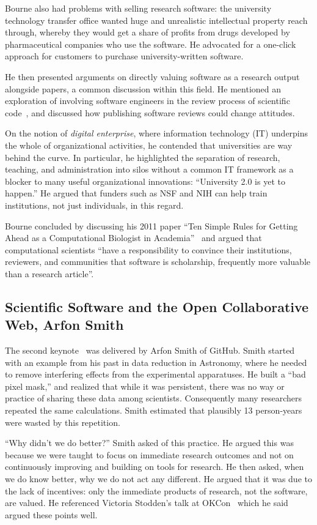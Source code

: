 \documentclass[11pt, oneside]{amsart}
\begin{document}
Bourne also had problems with selling research software: the
university technology transfer office wanted huge and unrealistic
intellectual property reach through, whereby they would get a share of
profits from drugs developed by pharmaceutical companies who use the
software.  He advocated for a one-click approach for customers to
purchase university-written software.

He then presented arguments on directly valuing software as a research
output alongside papers, a common discussion within this field.  He
mentioned an exploration of involving software engineers in the review
process of scientific code~\cite{peer-review-code}, and discussed how
publishing software reviews could change attitudes.

On the notion of \emph{digital enterprise}, where information
technology (IT) underpins the whole of organizational activities, he
contended that universities are way behind the curve. In particular,
he highlighted the separation of research, teaching, and
administration into silos without a common IT framework as a blocker
to many useful organizational innovations: ``University 2.0 is yet to
happen.''  He argued that funders such as NSF and NIH can help train
institutions, not just individuals, in this regard.

Bourne concluded by discussing his 2011 paper ``Ten Simple Rules for
Getting Ahead as a Computational Biologist in
Academia''~\cite{bourne_ten} and argued that computational scientists
``have a responsibility to convince their institutions, reviewers, and
communities that software is scholarship, frequently more valuable
than a research article''.

\subsection{Scientific Software and the Open Collaborative Web, Arfon Smith} \label{sec:keynote2}

The second keynote~\cite{WSSSPE1-keynote2} was delivered by Arfon
Smith of GitHub. Smith started with an example from his past in data
reduction in Astronomy, where he needed to remove interfering effects
from the experimental apparatuses. He built a ``bad pixel mask,'' and
realized that while it was persistent, there was no way or practice of
sharing these data among scientists. Consequently many researchers
repeated the same calculations. Smith estimated that plausibly 13 person-years
were wasted by this repetition.

``Why didn't we do better?''  Smith asked of this practice. He argued
this was because we were taught to focus on immediate research
outcomes and not on continuously improving and building on tools for
research. He then asked, when we do know better, why we do not act any
different. He argued that it was due to the lack of incentives: only
the immediate products of research, not the software, are valued.  He
referenced Victoria Stodden's talk at OKCon~\cite{okcon-stodden-talk}
which he said argued these points well.
\end{document}
